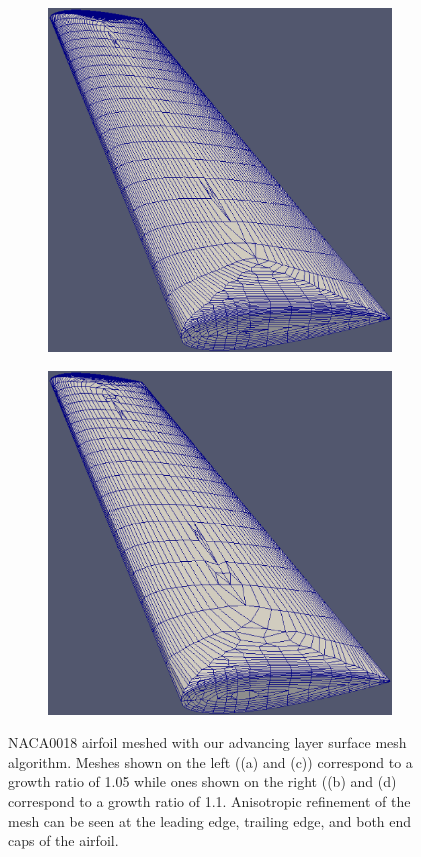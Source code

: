 \documentclass[conf]{new-aiaa}
\begin{document}
\begin{figure}
\begin{subfigure}{0.4\textwidth}
\centering
\includegraphics[width=0.9\linewidth]{meshCases/naca0018-x0.007-g1.05/oblique.eps}
\caption{}
\label{fig-oblique-low}
\end{subfigure}%
\begin{subfigure}{0.4\textwidth}
\centering
\includegraphics[width=0.9\linewidth]{meshCases/naca0018-x0.007-g1.1/oblique.eps}
\caption{}
\label{fig-oblique-high}
\end{subfigure}%
\caption{NACA0018 airfoil meshed with our advancing layer surface mesh algorithm. Meshes shown on the left ((a) and (c)) correspond to a growth ratio of 1.05 while ones shown on the right ((b) and (d) correspond to a growth ratio of 1.1. Anisotropic refinement of the mesh can be seen at the leading edge, trailing edge, and both end caps of the airfoil.}
\label{fig-naca}
\end{figure}
\end{document}
